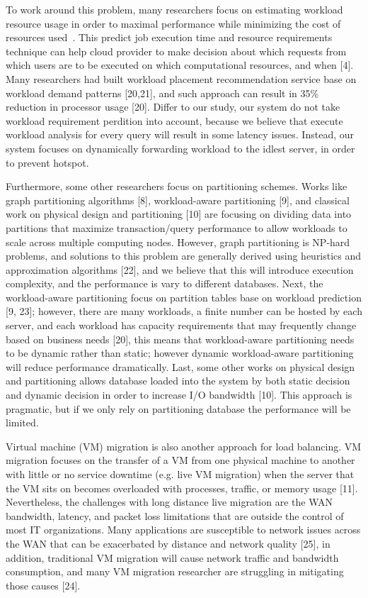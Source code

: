 \documentclass[]{acm_proc_article-sp}
\begin{document}
To work around this problem, many researchers focus on estimating workload resource usage in order to maximal performance while minimizing the cost of resources used~\cite{citeulike:6656217,5452742,curino2011relational, MIT-Relational}. This predict job execution time and resource requirements technique can help cloud provider to make decision about which requests from which users are to be executed on which computational resources, and when [4]. Many researchers had built workload placement recommendation service base on workload demand patterns [20,21], and such approach can result in 35\% reduction in processor usage [20]. Differ to our study, our system do not take workload requirement perdition into account, because we believe that execute workload analysis for every query will result in some latency issues. Instead, our system focuses on dynamically forwarding workload to the idlest server, in order to prevent hotspot.
 
Furthermore, some other researchers focus on partitioning schemes. Works like graph partitioning algorithms [8], workload-aware partitioning [9], and classical work on physical design and partitioning [10] are focusing on dividing data into partitions that maximize transaction/query performance to allow workloads to scale across multiple computing nodes. However, graph partitioning is NP-hard problems, and solutions to this problem are generally derived using heuristics and approximation algorithms [22], and we believe that this will introduce execution complexity, and the performance is vary to different databases. Next, the workload-aware partitioning focus on partition tables base on workload prediction [9, 23]; however, there are many workloads, a ﬁnite number can be hosted by each server, and each workload has capacity requirements that may frequently change based on business needs [20], this means that workload-aware partitioning needs to be dynamic rather than static; however dynamic workload-aware partitioning will reduce performance dramatically. Last, some other works on physical design and partitioning allows database loaded into the system by both static decision and dynamic decision in order to increase I/O bandwidth [10]. This approach is pragmatic, but if we only rely on partitioning database the performance will be limited.
 
Virtual machine (VM) migration is also another approach for load balancing. VM migration focuses on the transfer of a VM from one physical machine to another with little or no service downtime (e.g. live VM migration) when the server that the VM sits on becomes overloaded with processes, traffic, or memory usage [11]. Nevertheless, the challenges with long distance live migration are the WAN bandwidth, latency, and packet loss limitations that are outside the control of most IT organizations. Many applications are susceptible to network issues across the WAN that can be exacerbated by distance and network quality [25], in addition, traditional VM migration will cause network traffic and bandwidth consumption, and many VM migration researcher are struggling in mitigating those causes [24].
\end{document}
